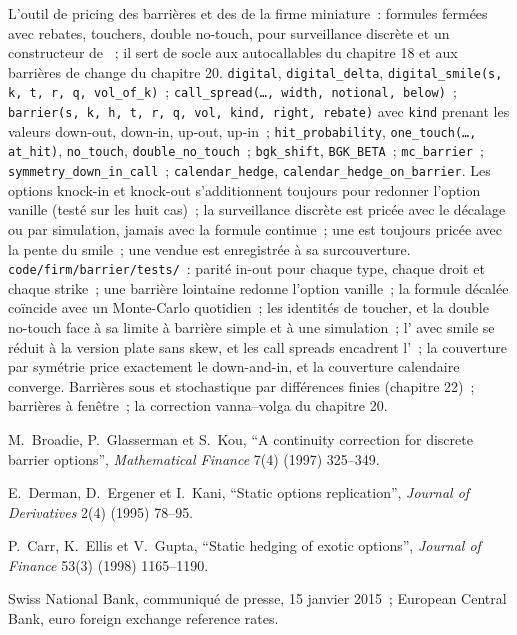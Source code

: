 \begin{build}
 L'outil de pricing des barrières et des  de la firme miniature~: formules fermées avec rebates, touchers, double no-touch,
 pour surveillance discrète et un constructeur de ~; il sert de socle aux autocallables du chapitre 18 et aux
barrières de change du chapitre 20.
 \texttt{digital}, \texttt{digital\_delta}, \texttt{digital\_smile(s, k, t, r, q, vol\_of\_k)}~;
\texttt{call\_spread(\ldots, width, notional, below)}~; \texttt{barrier(s, k, h, t, r, q, vol, kind, right, rebate)} avec
\texttt{kind} prenant les valeurs down-out, down-in, up-out, up-in~; \texttt{hit\_probability}, \texttt{one\_touch(\ldots, at\_hit)},
\texttt{no\_touch}, \texttt{double\_no\_touch}~; \texttt{bgk\_shift}, \texttt{BGK\_BETA}~; \texttt{mc\_barrier}~;
\texttt{symmetry\_down\_in\_call}~; \texttt{calendar\_hedge}, \texttt{calendar\_hedge\_on\_barrier}.
 Les options knock-in et knock-out s'additionnent toujours pour redonner l'option vanille (testé sur les huit cas)~; la surveillance discrète est pricée avec
le décalage ou par simulation, jamais avec la formule continue~; une  est toujours pricée avec la pente du smile~; une
 vendue est enregistrée à sa surcouverture.
 \texttt{code/firm/barrier/tests/}~: parité in-out pour chaque type, chaque droit et chaque strike~; une
barrière lointaine redonne l'option vanille~; la formule décalée coïncide avec un Monte-Carlo quotidien~; les identités de toucher, et la double no-touch
face à sa limite à barrière simple et à une simulation~; l' avec smile se réduit à la version plate sans skew, et les call
spreads encadrent l'~; la couverture par symétrie price exactement le down-and-in, et la couverture calendaire converge.
 Barrières sous  et stochastique par différences finies (chapitre 22)~; barrières à fenêtre~;
la correction vanna--volga du chapitre 20.
\end{build}

\begin{omsources}
\item M.~Broadie, P.~Glasserman et S.~Kou, ``A continuity correction for discrete barrier options'', \emph{Mathematical
Finance} 7(4) (1997) 325--349.
\item E.~Derman, D.~Ergener et I.~Kani, ``Static options replication'', \emph{Journal of Derivatives} 2(4) (1995) 78--95.
\item P.~Carr, K.~Ellis et V.~Gupta, ``Static hedging of exotic options'', \emph{Journal of Finance} 53(3) (1998)
1165--1190.
\item Swiss National Bank, communiqué de presse, 15 janvier 2015~; European Central Bank, euro foreign exchange reference rates.
\end{omsources}

